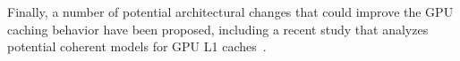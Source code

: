 



Finally, a number of potential architectural changes that could improve the GPU caching
behavior have been proposed, including a recent study that analyzes potential coherent models for GPU L1
caches~\cite{singh2013cache}.

